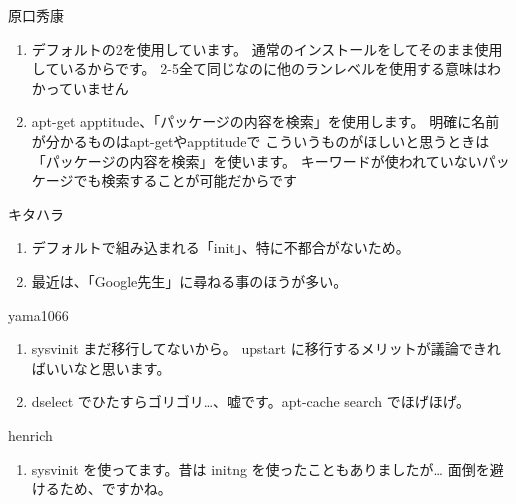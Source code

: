 

\begin{prework}{ 原口秀康 }

\begin{enumerate}
\item デフォルトの2を使用しています。
通常のインストールをしてそのまま使用しているからです。
2-5全て同じなのに他のランレベルを使用する意味はわかっていません

\item apt-get apptitude、「パッケージの内容を検索」を使用します。
明確に名前が分かるものはapt-getやapptitudeで
こういうものがほしいと思うときは「パッケージの内容を検索」を使います。
キーワードが使われていないパッケージでも検索することが可能だからです
\end{enumerate}

\end{prework}



\begin{prework}{ キタハラ }
\begin{enumerate}

\item デフォルトで組み込まれる「init」、特に不都合がないため。
\item 最近は、「Google先生」に尋ねる事のほうが多い。

\end{enumerate}

\end{prework}



\begin{prework}{ yama1066 }
\begin{enumerate}

\item sysvinit
まだ移行してないから。
upstart に移行するメリットが議論できればいいなと思います。
\item dselect でひたすらゴリゴリ…、嘘です。apt-cache search でほげほげ。
\end{enumerate}

\end{prework}

\begin{prework}{ henrich }
\begin{enumerate}
\item sysvinit を使ってます。昔は initng を使ったこともありましたが…
面倒を避けるため、ですかね。
\end{enumerate}

\end{prework}



